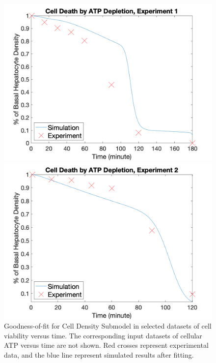 \documentclass[12pt]{article}
\begin{document}
\begin{figure}[ht] 
  \begin{minipage}[b]{0.5\linewidth}
    \centering
    \includegraphics[width=\linewidth]{den_vali1.png} 
  \end{minipage}%
  \begin{minipage}[b]{0.5\linewidth}
    \centering
    \includegraphics[width=\linewidth]{den_vali2.png} 
  \end{minipage} 
  \caption{Goodness-of-fit for Cell Density Submodel in selected datasets of cell viability versus time. The corresponding input datasets of cellular ATP versus time are not shown. Red crosses represent experimental data, and the blue line represent simulated results after fitting.}
  \label{fig:quad_den}
\end{figure}
\end{document}

